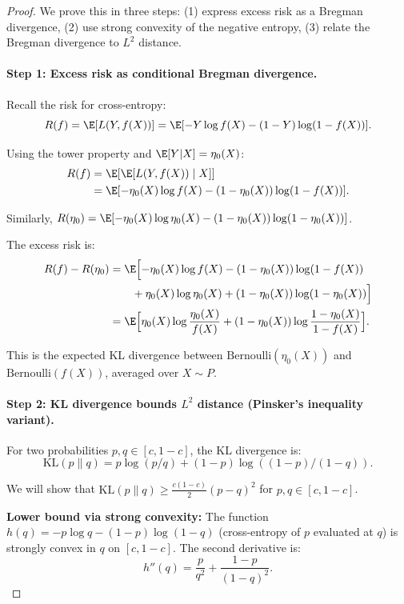 \begin{proof}
We prove this in three steps: (1) express excess risk as a Bregman divergence, (2) use strong convexity of the negative entropy, (3) relate the Bregman divergence to $L^2$ distance.

\paragraph{Step 1: Excess risk as conditional Bregman divergence.}

Recall the risk for cross-entropy:
\[
R(f) = \E[L(Y, f(X))] = \E[-Y \log f(X) - (1-Y) \log(1-f(X))].
\]

Using the tower property and $\E[Y|X] = \eta_0(X)$:
\begin{align*}
R(f)
&= \E[\E[L(Y, f(X)) \mid X]] \\
&= \E[-\eta_0(X) \log f(X) - (1-\eta_0(X)) \log(1-f(X))].
\end{align*}

Similarly, $R(\eta_0) = \E[-\eta_0(X) \log \eta_0(X) - (1-\eta_0(X)) \log(1-\eta_0(X))]$.

The excess risk is:
\begin{align}
R(f) - R(\eta_0)
&= \E\Bigl[ -\eta_0(X) \log f(X) - (1-\eta_0(X)) \log(1-f(X)) \nonumber \\
&\quad\quad + \eta_0(X) \log \eta_0(X) + (1-\eta_0(X)) \log(1-\eta_0(X)) \Bigr] \nonumber \\
&= \E\Bigl[ \eta_0(X) \log \frac{\eta_0(X)}{f(X)} + (1-\eta_0(X)) \log \frac{1-\eta_0(X)}{1-f(X)} \Bigr]. \label{eq:kl-divergence}
\end{align}

This is the expected KL divergence between $\text{Bernoulli}(\eta_0(X))$ and $\text{Bernoulli}(f(X))$, averaged over $X \sim P$.

\paragraph{Step 2: KL divergence bounds $L^2$ distance (Pinsker's inequality variant).}

For two probabilities $p, q \in [c, 1-c]$, the KL divergence is:
\[
\text{KL}(p \| q) = p \log(p/q) + (1-p) \log((1-p)/(1-q)).
\]

We will show that $\text{KL}(p \| q) \ge \frac{c(1-c)}{2} (p - q)^2$ for $p, q \in [c, 1-c]$.

\textbf{Lower bound via strong convexity:}
The function $h(q) = -p \log q - (1-p) \log(1-q)$ (cross-entropy of $p$ evaluated at $q$) is strongly convex in $q$ on $[c, 1-c]$. The second derivative is:
\[
h''(q) = \frac{p}{q^2} + \frac{1-p}{(1-q)^2}.
\]


\end{proof}
